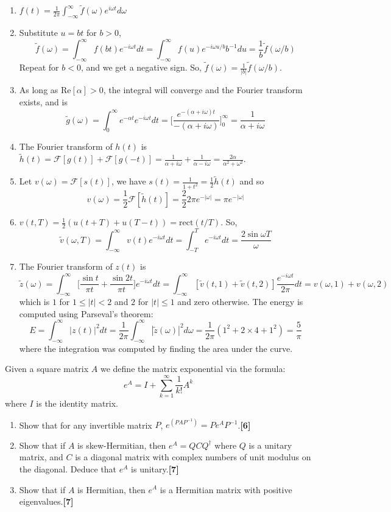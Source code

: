 \documentclass[a4paper]{article}
\begin{document}
\begin{ans}\leavevmode
\begin{enumerate}[label=(\alph*)]
\item $f(t)=\frac{1}{2\pi}\int_{-\infty}^\infty\tilde{f}(\omega)e^{i\omega t}d\omega$
\item Substitute $u=bt$ for $b>0$,
$$\tilde{f}(\omega)=\int_{-\infty}^\infty f(bt)e^{-i\omega t}dt=\int_{-\infty}^\infty f(u)e^{-i\omega u/b}b^{-1}du=\frac{1}{b}\tilde{f}(\omega/b)$$
Repeat for $b<0$, and we get a negative sign. So, $\tilde{f}(\omega)=\frac{1}{|b|}\tilde{f}(\omega/b)$.
\item As long as $\text{Re}[\alpha]>0$, the integral will converge and the Fourier transform exists, and is
$$\tilde{g}(\omega)=\int_0^\infty e^{-\alpha t}e^{-i\omega t}dt=\bigg[\frac{e^{-(\alpha+i\omega)t}}{-(\alpha+i\omega)}\bigg]_0^\infty=\frac{1}{\alpha+i\omega}$$
\item The Fourier transform of $h(t)$ is
$\tilde{h}(t)=\mathcal{F}[g(t)]+\mathcal{F}[g(-t)]=\frac{1}{\alpha+i\omega}+\frac{1}{\alpha-i\omega}=\frac{2\alpha}{\alpha^2+\omega^2}$. 
\item Let $v(\omega)=\mathcal{F}[s(t)]$, we have $s(t)=\frac{1}{1+t^2}=\frac{1}{2}\tilde{h}(t)$ and so $$v(\omega)=\frac{1}{2}\mathcal{F}[\tilde{h}(t)]=\frac{2}{2}2\pi e^{-|\omega|}=\pi e^{-|\omega|}$$
\item $v(t,T)=\frac{1}{2}(u(t+T)+u(T-t))=\text{rect}(t/T)$. So,
$$\tilde{v}(\omega,T)=\int_{-\infty}^\infty v(t)e^{-i\omega t}dt=\int_{-T}^Te^{-i\omega t}dt=\frac{2\sin\omega T}{\omega}$$
\item The Fourier transform of $z(t)$ is
$$\tilde{z}(\omega)=\int_{-\infty}^\infty\bigg[\frac{\sin t}{\pi t}+\frac{\sin 2t}{\pi t}\bigg]e^{-i\omega t}dt=\int_{-\infty}^\infty[\tilde{v}(t,1)+\tilde{v}(t,2)]\frac{e^{-i\omega t}}{2\pi}dt=v(\omega,1)+v(\omega,2)$$
which is $1$ for $1\leq|t|<2$ and $2$ for $|t|\leq1$ and zero otherwise. The energy is computed using Parseval's theorem:
$$E=\int_{-\infty}^\infty|z(t)|^2dt=\frac{1}{2\pi}\int_{-\infty}^\infty|\tilde{z}(\omega)|^2d\omega=\frac{1}{2\pi}(1^2+2\times 4+1^2)=\frac{5}{\pi}$$
where the integration was computed by finding the area under the curve.
\end{enumerate}
\end{ans}
\newpage
\begin{qns}
Given a square matrix $A$ we define the matrix exponential via the formula:
$$e^A=I+\sum_{k=1}^\infty\frac{1}{k!}A^k$$
where $I$ is the identity matrix.
\begin{enumerate}[label=(\alph*)]
\item Show that for any invertible matrix $P$, $e^{(PAP^{−1})} = Pe^AP^{−1}$.\hfill\textbf{[6]}
\item Show that if $A$ is skew-Hermitian, then $e^A=QCQ^\dag$ where $Q$ is a unitary matrix, and $C$ is a diagonal matrix with complex numbers of unit modulus on the diagonal. Deduce that $e^A$ is unitary.\hfill\textbf{[7]}
\item Show that if $A$ is Hermitian, then $e^A$ is a Hermitian matrix with positive eigenvalues.\hfill\textbf{[7]}
\end{enumerate}
\end{qns}
\end{document}
